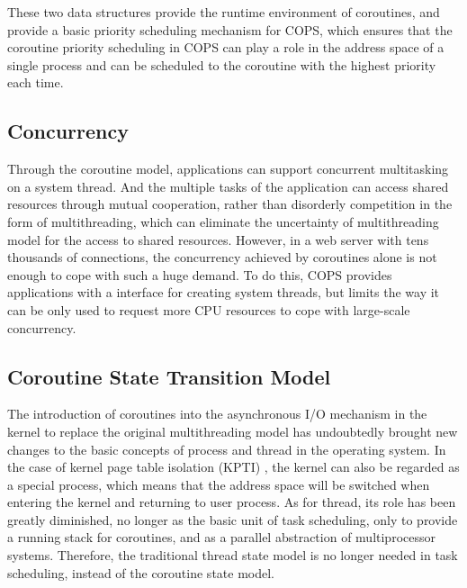 \documentclass[sigconf,review,anonymous]{acmart}
\begin{document}
These two data structures provide the runtime environment of coroutines, and provide a basic priority scheduling mechanism for COPS, which ensures that the coroutine priority scheduling in COPS can play a role in the address space of a single process and can be scheduled to the coroutine with the highest priority each time.

\subsection{Concurrency}
\label{section: Concurrency}

Through the coroutine model, applications can support concurrent multitasking on a system thread. And the multiple tasks of the application can access shared resources through mutual cooperation, rather than disorderly competition in the form of multithreading, which can eliminate the uncertainty of multithreading model for the access to shared resources. However, in a web server with tens thousands of connections, the concurrency achieved by coroutines alone is not enough to cope with such a huge demand. To do this, COPS provides applications with a interface for creating system threads, but limits the way it can be only used to request more CPU resources to cope with large-scale concurrency. 


\subsection{Coroutine State Transition Model}
\label{section: state-transition}

The introduction of coroutines into the asynchronous I/O mechanism in the kernel to replace the original multithreading model has undoubtedly brought new changes to the basic concepts of process and thread in the operating system. In the case of kernel page table isolation (KPTI) \cite{kpti}, the kernel can also be regarded as a special process, which means that the address space will be switched when entering the kernel and returning to user process. As for thread, its role has been greatly diminished, no longer as the basic unit of task scheduling, only to provide a running stack for coroutines, and as a parallel abstraction of multiprocessor systems. Therefore, the traditional thread state model is no longer needed in task scheduling, instead of the coroutine state model.
\end{document}
